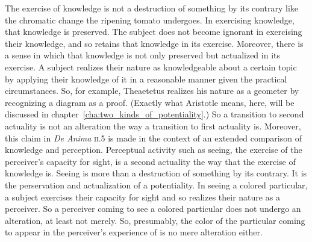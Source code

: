 The exercise of knowledge is not a destruction of something by its contrary like the chromatic change the ripening tomato undergoes. In exercising knowledge, that knowledge is preserved. The subject does not become ignorant in exercising their knowledge, and so retains that knowledge in its exercise. Moreover, there is a sense in which that knowledge is not only preserved but actualized in its exercise. A subject realizes their nature as knowledgeable about a certain topic by applying their knowledge of it in a reasonable manner given the practical circumstances. So, for example, Theaetetus realizes his nature as a geometer by recognizing a diagram as a proof. (Exactly what Aristotle means, here, will be discussed in chapter~\ref{cha:two_kinds_of_potentiality}.) So a transition to second actuality is not an alteration the way a transition to first actuality is. Moreover, this claim in \emph{De Anima} \textsc{ii}.5 is made in the context of an extended comparison of knowledge and perception. Perceptual activity such as seeing, the exercise of the perceiver's capacity for sight, is a second actuality the way that the exercise of knowledge is. Seeing is more than a destruction of something by its contrary. It is the perservation and actualization of a potentiality. In seeing a colored particular, a subject exercises their capacity for sight and so realizes their nature as a perceiver. So a perceiver coming to see a colored particular does not undergo an alteration, at least not merely. So, presumably, the color of the particular coming to appear in the perceiver's experience of is no mere alteration either. %
% 

